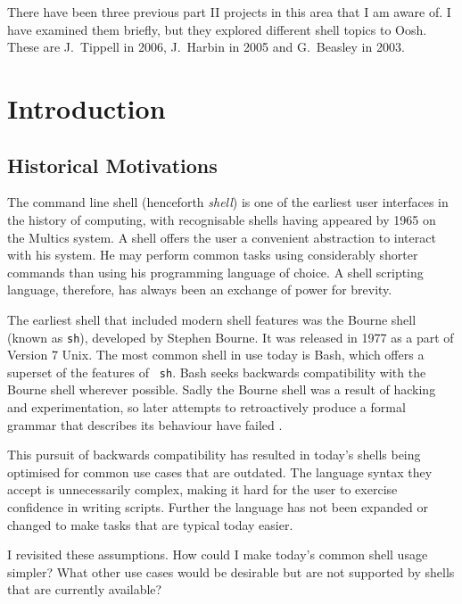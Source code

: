\documentclass[12pt,twoside,notitlepage]{report}
\begin{document}
There have been three previous part II projects in this area that I am
aware of. I have examined them briefly, but they explored different
shell topics to Oosh. These are J.\ Tippell in 2006, J.\ Harbin in
2005 and G.\ Beasley in 2003.


\cleardoublepage        %

\setcounter{page}{1}
\pagestyle{headings}

\chapter{Introduction}

\section{Historical Motivations}
The command line shell (henceforth \emph{shell}) is one of the earliest user
interfaces in the history of computing, with recognisable shells having appeared
by 1965 \cite{multics} on the Multics system. A shell offers the user a
convenient abstraction to interact with his system. He may perform common tasks
using considerably shorter commands than using his programming language of
choice. A shell scripting language, therefore, has always been an exchange of
power for brevity.

The earliest shell that included modern shell features was the Bourne
shell (known as {\tt sh}), developed by Stephen Bourne. It was
released in 1977 as a part of Version 7 Unix. The most common shell in
use today is Bash, which offers a superset of the features of {\tt
  sh}. Bash seeks backwards compatibility with the Bourne shell
wherever possible. Sadly the Bourne shell was a result of hacking and
experimentation, so later attempts to retroactively produce a formal
grammar that describes its behaviour have failed \cite{bourne}.

This pursuit of backwards compatibility has resulted in today's shells
being optimised for common use cases that are outdated. The language
syntax they accept is unnecessarily complex, making it hard for the
user to exercise confidence in writing scripts. Further the language
has not been expanded or changed to make tasks that are typical today easier.

I revisited these assumptions. How could I make today's common shell
usage simpler? What other use cases would be desirable but are not
supported by shells that are currently available?
\end{document}
